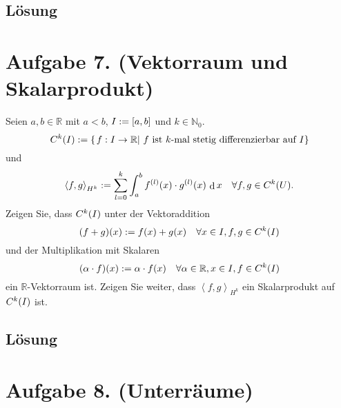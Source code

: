 \documentclass[german,12pt]{homework}
\newcommand{\NN}{\mathbb{N}}
\newcommand{\RR}{\mathbb{R}}
\newcommand{\dotproduct}[2]{\left\langle{#1, #2}\right\rangle}
\newcommand{\dd}{\,\differ}
\DeclareMathOperator{\differ}{d}
\DeclarePairedDelimiter{\enbrace}{(}{)}
\DeclarePairedDelimiter{\benbrace}{[}{]}
\DeclarePairedDelimiter{\penbrace}{\{}{\}}
\begin{document}
    \subsection*{Lösung} \clearpage

    \section*{Aufgabe 7. (Vektorraum und Skalarprodukt)}

    \begin{problem}
        Seien \(a, b \in \RR\) mit \(a < b\), \(I := \benbrace*{a, b}\) und
        \(k \in \NN_0\).
        \[C^k\enbrace*{I} := \penbrace*{\left.f: I \to \RR\right|\,f\text{ ist }k\text{-mal stetig differenzierbar auf }I}\]
        und
        \[\dotproduct{f}{g}_{H^k} := \sum_{l = 0}^k\int_a^bf^{\enbrace*{l}}\enbrace*{x} \cdot g^{\enbrace*{l}}\enbrace*{x}\dd{x} \quad {\forall}f, g \in C^k\enbrace*{U}.\]
        Zeigen Sie, dass \(C^k\enbrace*{I}\) unter der Vektoraddition
        \[\enbrace*{f + g}\enbrace*{x} := f\enbrace*{x} + g\enbrace*{x} \quad
        {\forall}x \in I, f, g \in C^k\enbrace*{I}\]
        und der Multiplikation mit Skalaren
        \[\enbrace*{\alpha \cdot f}\enbrace*{x} := \alpha \cdot f\enbrace*{x}
        \quad {\forall}\alpha \in \RR, x \in I, f \in C^k\enbrace*{I}\]
        ein \(\RR\)-Vektorraum ist. Zeigen Sie weiter, dass \(\dotproduct{f}{g}_{H^k}\) ein Skalarprodukt auf \(C^k\enbrace*{I}\) ist.
    \end{problem}

    \subsection*{Lösung} \clearpage

    \section*{Aufgabe 8. (Unterräume)}
\end{document}
